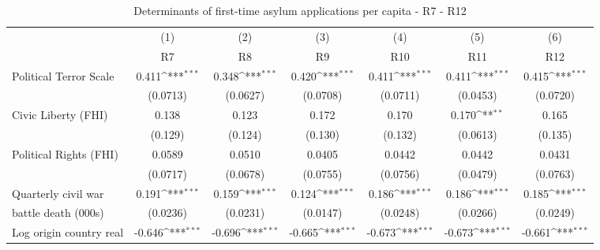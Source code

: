 \begin{table}[htbp]\centering \footnotesize
	\def\sym#1{\ifmmode^{#1}\else\(^{#1}\)\fi}
	\caption{Determinants of first-time asylum applications per capita - R7 - R12}
	\begin{tabular}{l*{6}{c}}
		\hline\hline
		&\multicolumn{1}{c}{(1)}     &\multicolumn{1}{c}{(2)}       &\multicolumn{1}{c}{(3)}       &\multicolumn{1}{c}{(4)}    	&\multicolumn{1}{c}{(5)}  	&\multicolumn{1}{c}{(6)}   \\
		&\multicolumn{1}{c}{R7}         &\multicolumn{1}{c}{R8}         &\multicolumn{1}{c}{R9}         &\multicolumn{1}{c}{R10}         &\multicolumn{1}{c}{R11}         &\multicolumn{1}{c}{R12}         \\
\hline
Political Terror Scale&       0.411\sym{***}&   0.348\sym{***}                   &       0.420\sym{***}&       0.411\sym{***}&       0.411\sym{***}&       0.415\sym{***}\\
                    &    (0.0713)         &      (0.0627)               &    (0.0708)         &    (0.0711)         &    (0.0453)         &    (0.0720)         \\
[0.5em]
Civic Liberty (FHI) &       0.138         &       0.123              &       0.172         &       0.170         &       0.170\sym{**} &       0.165         \\
                    &     (0.129)         &       (0.124)              &     (0.130)         &     (0.132)         &    (0.0613)         &     (0.135)         \\
[0.5em]
Political Rights (FHI)&      0.0589         &      0.0510                &      0.0405         &      0.0442         &      0.0442         &      0.0431         \\
                    &    (0.0717)         &        (0.0678)              &    (0.0755)         &    (0.0756)         &    (0.0479)         &    (0.0763)         \\
[0.5em]
Quarterly civil war &       0.191\sym{***}&       0.159\sym{***}              &    0.124\sym{***}                 &       0.186\sym{***}&       0.186\sym{***}&       0.185\sym{***}\\
 battle death (000s)                   &    (0.0236)         &     (0.0231)                 &    (0.0147)                  &    (0.0248)         &    (0.0266)         &    (0.0249)         \\
[0.5em]
Log origin country real &      -0.646\sym{***}&   -0.696\sym{***}                  &      -0.665\sym{***}&      -0.673\sym{***}&      -0.673\sym{***}&      -0.661\sym{***}\\

\end{tabular}
\end{table}

